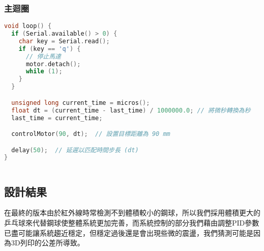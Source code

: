 \subsubsection{主迴圈}
\begin{lstlisting}[language=C]
void loop() {
  if (Serial.available() > 0) {
    char key = Serial.read();
    if (key == 'q') {
      // 停止馬達
      motor.detach();
      while (1);
    }
  }

  unsigned long current_time = micros();
  float dt = (current_time - last_time) / 1000000.0; // 將微秒轉換為秒
  last_time = current_time;

  controlMotor(90, dt);  // 設置目標距離為 90 mm

  delay(50);  // 延遲以匹配時間步長 (dt)
}
  
\end{lstlisting}

\subsection{設計結果}
在最終的版本由於紅外線時常檢測不到體積較小的鋼球，所以我們採用體積更大的乒乓球來代替鋼球使整體系統更加完善，而系統控制的部分我們藉由調整PID參數已盡可能讓系統趨近穩定，但穩定過後還是會出現些微的震盪，我們猜測可能是因為3D列印的公差所導致。



